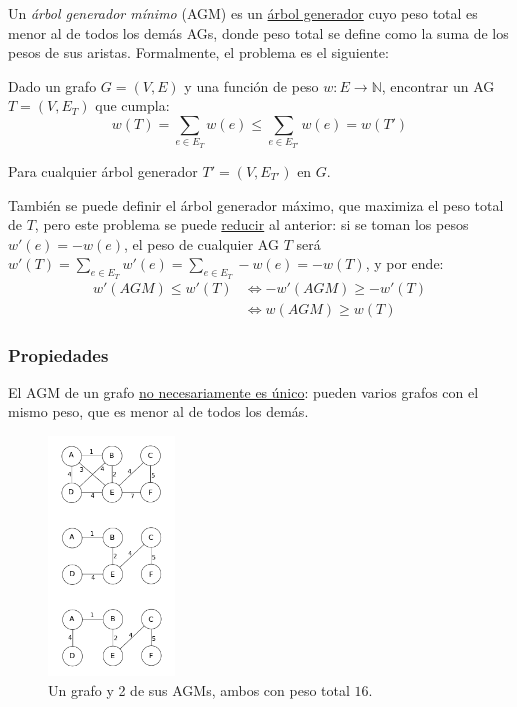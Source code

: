 \documentclass[a4paper]{report}
\newcommand{\N}{\mathbb{N}}
\begin{document}
Un \textit{árbol generador mínimo} (AGM) es un \hyperref[arbol-generador]{árbol generador} cuyo peso total es menor al de todos los demás AGs, donde peso total se define como la suma de los pesos de sus aristas. Formalmente, el problema es el siguiente:

\begin{problema}
    Dado un grafo $G = (V, E)$ y una función de peso $w: E \longrightarrow \N$, encontrar un AG $T = (V, E_T)$ que cumpla:
    $$w(T) = \sum_{e \in E_T} w(e) \leq \sum_{e \in E_{T'}} w(e) = w(T')$$

    Para cualquier árbol generador $T' = (V, E_{T'})$ en $G$.
\end{problema}

También se puede definir el árbol generador máximo, que maximiza el peso total de $T$, pero este problema se puede \hyperref[reducciones]{reducir} al anterior: si se toman los pesos $w'(e) = -w(e)$, el peso  de cualquier AG $T$ será $w'(T) = \sum_{e \in E_T} w'(e) = \sum_{e \in E_T} -w(e) = -w(T)$, y por ende:
\begin{align*}
    w'(AGM) \leq w'(T) & \iff -w'(AGM) \geq -w'(T) \\
                       & \iff w(AGM) \geq w(T)
\end{align*}

\subsubsection{Propiedades}

El AGM de un grafo \underline{no necesariamente es único}: pueden varios grafos con el mismo peso, que es menor al de todos los demás.

\begin{figure}[H]
    \centering
    \includegraphics[width=0.3\textwidth]{ejemplo_agm.png}
    \caption*{Un grafo y 2 de sus AGMs, ambos con peso total $16$.}
\end{figure}
\end{document}
